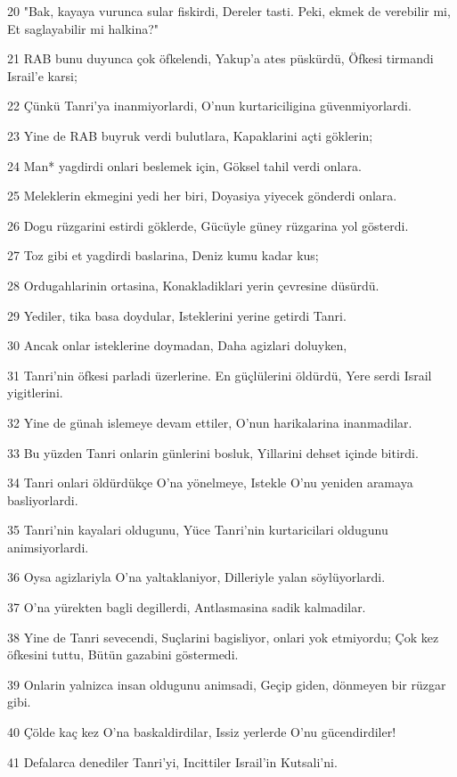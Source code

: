 \par 20 "Bak, kayaya vurunca sular fiskirdi, Dereler tasti. Peki, ekmek de verebilir mi, Et saglayabilir mi halkina?"
\par 21 RAB bunu duyunca çok öfkelendi, Yakup'a ates püskürdü, Öfkesi tirmandi Israil'e karsi;
\par 22 Çünkü Tanri'ya inanmiyorlardi, O'nun kurtariciligina güvenmiyorlardi.
\par 23 Yine de RAB buyruk verdi bulutlara, Kapaklarini açti göklerin;
\par 24 Man* yagdirdi onlari beslemek için, Göksel tahil verdi onlara.
\par 25 Meleklerin ekmegini yedi her biri, Doyasiya yiyecek gönderdi onlara.
\par 26 Dogu rüzgarini estirdi göklerde, Gücüyle güney rüzgarina yol gösterdi.
\par 27 Toz gibi et yagdirdi baslarina, Deniz kumu kadar kus;
\par 28 Ordugahlarinin ortasina, Konakladiklari yerin çevresine düsürdü.
\par 29 Yediler, tika basa doydular, Isteklerini yerine getirdi Tanri.
\par 30 Ancak onlar isteklerine doymadan, Daha agizlari doluyken,
\par 31 Tanri'nin öfkesi parladi üzerlerine. En güçlülerini öldürdü, Yere serdi Israil yigitlerini.
\par 32 Yine de günah islemeye devam ettiler, O'nun harikalarina inanmadilar.
\par 33 Bu yüzden Tanri onlarin günlerini bosluk, Yillarini dehset içinde bitirdi.
\par 34 Tanri onlari öldürdükçe O'na yönelmeye, Istekle O'nu yeniden aramaya basliyorlardi.
\par 35 Tanri'nin kayalari oldugunu, Yüce Tanri'nin kurtaricilari oldugunu animsiyorlardi.
\par 36 Oysa agizlariyla O'na yaltaklaniyor, Dilleriyle yalan söylüyorlardi.
\par 37 O'na yürekten bagli degillerdi, Antlasmasina sadik kalmadilar.
\par 38 Yine de Tanri sevecendi, Suçlarini bagisliyor, onlari yok etmiyordu; Çok kez öfkesini tuttu, Bütün gazabini göstermedi.
\par 39 Onlarin yalnizca insan oldugunu animsadi, Geçip giden, dönmeyen bir rüzgar gibi.
\par 40 Çölde kaç kez O'na baskaldirdilar, Issiz yerlerde O'nu gücendirdiler!
\par 41 Defalarca denediler Tanri'yi, Incittiler Israil'in Kutsali'ni.
